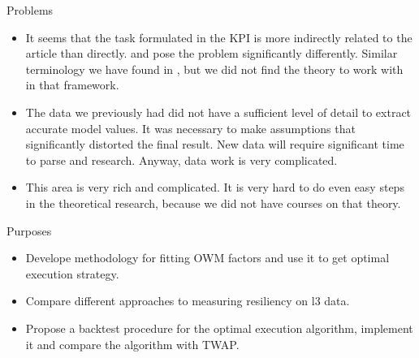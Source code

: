 \documentclass[]{beamer}
\begin{document}
\begin{frame}[t]
\begin{columns}[t]
    \begin{column}{\onecolwid} %
    
        
        \begin{block}{Problems}
            \begin{itemize}
                \item It seems that the task formulated in the KPI is more indirectly related to the article \cite{obizhaeva2013optimal}
                than directly. \cite{obizhaeva2013optimal} and \cite{velu2020algorithmic} pose 
                the problem significantly differently. Similar terminology we have found in \cite{webster2023handbook}, but 
                we did not find the theory to work with in that framework.
                \item The data we previously had did not have a sufficient level of detail to extract accurate model values. 
                It was necessary to make assumptions that significantly distorted the final result. 
                New data will require significant time to parse and research. Anyway, data work is very complicated.
                \item This area is very rich and complicated. It is very hard to do even easy steps in the theoretical research, 
                because we did not have courses on that theory. 
                
            \end{itemize}

            
            \end{block}


        \begin{block}{Purposes}
        \begin{itemize}
            \item Develope methodology for fitting OWM factors and use it to get optimal execution strategy.
            \item Compare different approaches to measuring resiliency on l3 data.
            \item Propose a backtest procedure for the optimal execution algorithm, implement it and compare the algorithm with TWAP.
        \end{itemize}
        

\end{block}
\end{column}
\end{columns}
\end{frame}
\end{document}
